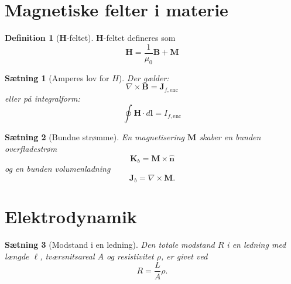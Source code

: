 \documentclass[]{article}
\newcommand{\hn}{\hat {\mathbf{n}}}
\newtheorem{theorem}{Sætning}
\theoremstyle{definition}
\newtheorem{definition}{Definition}
\begin{document}
\section{Magnetiske felter i materie}

\begin{definition}[$\mathbf{H}$-feltet]
	$\mathbf{H}$-feltet defineres som
	\begin{equation*}
		\mathbf{H} = \dfrac{1}{\mu_0} \mathbf{B} + \mathbf{M}
	\end{equation*}
\end{definition}

\begin{theorem}[Amperes lov for $H$]
	Der gælder:
	\begin{equation*}
		\nabla \times \mathbf{B} = \mathbf{J}_{f, \text{enc}}
	\end{equation*}
	eller på integralform:
	\begin{equation*}
		\oint \mathbf{H} \cdot d \mathbf{l} = I_{f, \text{enc}}
	\end{equation*}
\end{theorem}

\begin{theorem}[Bundne strømme]
	En magnetisering $\mathbf{M}$ skaber en bunden overfladestrøm
	\begin{equation*}
		\mathbf{K}_b = \mathbf{M} \times \hn
	\end{equation*}
	og en bunden volumenladning
	\begin{equation*}
		\mathbf{J}_b = \nabla \times \mathbf{M}.
	\end{equation*}
\end{theorem}

\section{Elektrodynamik}

\begin{theorem}[Modstand i en ledning]
	Den totale modstand $R$ i en ledning med længde $\ell$, tværsnitsareal $A$ og resistivitet $\rho$, er givet ved
	\begin{equation*}
		R = \frac{L}{A}\rho.
	\end{equation*}
\end{theorem}
\end{document}
